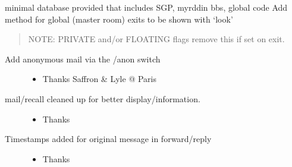 \documentclass[letterpaper,10pt,english]{sphinxmanual}
\begin{document}
\sphinxAtStartPar
minimal database provided that includes SGP, myrddin bbs, global code
Add method for global (master room) exits to be shown with ‘look’
\begin{quote}

\sphinxAtStartPar
NOTE: PRIVATE and/or FLOATING flags remove this if set on exit.
\end{quote}
\begin{description}
\item[{Add anonymous mail via the /anon switch}] \leavevmode\begin{itemize}
\item {} 
\sphinxAtStartPar
Thanks Saffron \& Lyle @ Paris

\end{itemize}

\item[{mail/recall cleaned up for better display/information.}] \leavevmode\begin{itemize}
\item {} 
\sphinxAtStartPar
Thanks 

\end{itemize}

\item[{Timestamps added for original message in forward/reply}] \leavevmode\begin{itemize}
\item {} 
\sphinxAtStartPar
Thanks 

\end{itemize}

\end{description}
\end{document}
